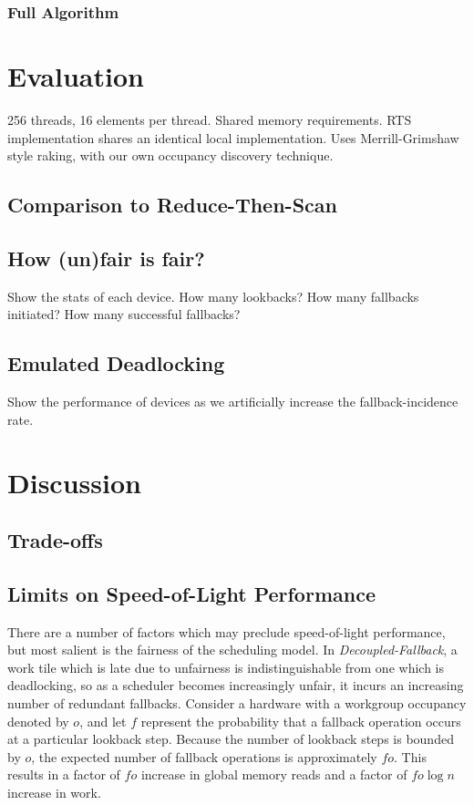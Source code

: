 \documentclass[sigconf]{acmart}
\begin{document}
\subsubsection{Full Algorithm}

\section{Evaluation}
256 threads, 16 elements per thread. Shared memory requirements. RTS implementation shares an identical local implementation. Uses Merrill-Grimshaw style raking, with our own occupancy discovery technique. 

\subsection{Comparison to Reduce-Then-Scan}

\subsection{How (un)fair is fair?}
Show the stats of each device. How many lookbacks?  How many fallbacks initiated? How many successful fallbacks?

\subsection{Emulated Deadlocking}
Show the performance of devices as we artificially increase the fallback-incidence rate.

\section{Discussion}

\subsection{Trade-offs}

\subsection{Limits on Speed-of-Light Performance}
There are a number of factors which may preclude speed-of-light performance, but most salient is the fairness of the scheduling model. In \emph{Decoupled-Fallback}, a work tile which is late due to unfairness is indistinguishable from one which is deadlocking, so as a scheduler becomes increasingly unfair, it incurs an increasing number of redundant fallbacks. Consider a hardware with a workgroup occupancy denoted by $o$, and let $f$ represent the probability that a fallback operation occurs at a particular lookback step. Because the number of lookback steps is bounded by $o$, the expected number of fallback operations is approximately $fo$. This results in a factor of $fo$ increase in global memory reads and a factor of $fo\log{n}$ increase in work.
\end{document}
